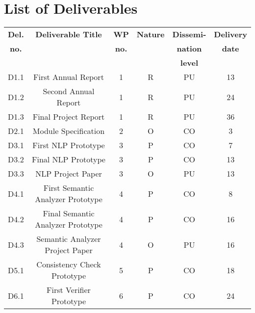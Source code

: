 
\section{List of Deliverables}

\begin{table}[hbpt]\centering
	\begin{adjustbox}{width=1\textwidth}
			\begin{tabular}{ |c|c|c|c|c|c|} 
			\hline
			\textbf{Del.} & \textbf{Deliverable Title} & \textbf{WP} & \textbf{Nature} & \textbf{Dissemi-} & \textbf{Delivery} \\
			\textbf{no.} & \textbf{~} & \textbf{no.} & ~ & \textbf{nation} & \textbf{date}  \\
			~ & ~ & ~ & ~ & \textbf{level} & ~  \\
			\hline
			
			D1.1 & First Annual Report & 1 & R & PU & 13\\
			\hline
			
			D1.2 & Second Annual Report & 1 & R & PU & 24\\
			\hline
			
			D1.3 & Final Project Report & 1 & R & PU & 36\\
			\hline
			
			D2.1 & Module Specification & 2 & O & CO & 3\\
			\hline
			
			D3.1 & First \gls{NLP} Prototype & 3 & P & CO & 7\\
			\hline
			
			D3.2 & Final \gls{NLP} Prototype & 3 & P & CO & 13\\
			\hline
			
			D3.3 & \gls{NLP} Project Paper & 3 & O & PU & 13\\
			\hline
			
			D4.1 & First Semantic Analyzer Prototype & 4 & P & CO & 8\\
			\hline
			
			D4.2 & Final Semantic Analyzer Prototype & 4 & P & CO & 16\\
			\hline
			
			D4.3 & Semantic Analyzer Project Paper & 4 & O & PU & 16\\
			\hline
			
			D5.1 & Consistency Check Prototype & 5 & P & CO & 18\\
			\hline
			
			D6.1 & First Verifier Prototype & 6 & P & CO & 24\\
			\hline
			

\end{tabular}
\end{adjustbox}
\end{table}
